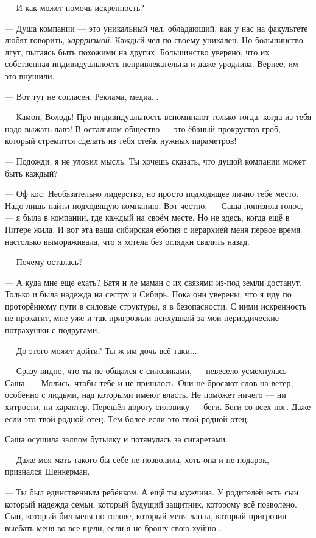 \documentclass[a4paper,10pt,fleqn]{book}\usepackage{polyglossia}\setdefaultlanguage{english}\setotherlanguage{russian}\defaultfontfeatures{Ligatures=TeX,Mapping=tex-text} \usepackage{xcolor}\definecolor{lightgray}{HTML}{bbbbbb}\color{lightgray}\newcommand{\ml}[3]{\textcolor{black}{#3}}
\begin{document}
--- И как может помочь искренность?

--- Душа компании --- это уникальный чел, обладающий, как у нас на факультете любят говорить, \emph{харрризмой}.
Каждый чел по-своему уникален.
Но большинство лгут, пытаясь быть похожими на других.
Большинство уверено, что их собственная индивидуальность непривлекательна и даже уродлива.
Вернее, им это внушили.

--- Вот тут не согласен.
Реклама, медиа...

--- Камон, Володь!
Про индивидуальность вспоминают только тогда, когда из тебя надо выжать лавэ!
В остальном общество --- это ёбаный прокрустов гроб, который стремится сделать из тебя стейк нужных параметров!

--- Подожди, я не уловил мысль.
Ты хочешь сказать, что душой компании может быть каждый?

--- Оф кос.
Необязательно лидерство, но просто подходящее лично тебе место.
Надо лишь найти подходящую компанию.
Вот честно, --- Саша понизила голос, --- я была в компании, где каждый на своём месте.
Но не здесь, когда ещё в Питере жила.
И вот эта ваша сибирская еботня с иерархией меня первое время настолько вымораживала, что я хотела без оглядки свалить назад.

--- Почему осталась?

--- А куда мне ещё ехать?
Батя и ле маман с их связями из-под земли достанут.
Только и была надежда на сестру и Сибирь.
Пока они уверены, что я иду по проторённому пути в силовые структуры, я в безопасности.
С ними искренность не прокатит, мне уже и так пригрозили психушкой за мои периодические потрахушки с подругами.

--- До этого может дойти?
Ты ж им дочь всё-таки...

--- Сразу видно, что ты не общался с силовиками, --- невесело усмехнулась Саша.
--- Молись, чтобы тебе и не пришлось.
Они не бросают слов на ветер, особенно с людьми, над которыми имеют власть.
Не поможет ничего --- ни хитрости, ни характер.
Перешёл дорогу силовику --- беги.
Беги со всех ног.
Даже если это твой родной отец.
Тем более если это твой родной отец.

Саша осушила залпом бутылку и потянулась за сигаретами.

--- Даже моя мать такого бы себе не позволила, хоть она и не подарок, --- признался Шенкерман.

--- Ты был единственным ребёнком.
А ещё ты мужчина.
У родителей есть сын, который надежда семьи, который будущий защитник, которому всё позволено.
Сын, который бил меня по голове, который меня лапал, который пригрозил выебать меня во все щели, если я не брошу свою хуйню...
\end{document}
